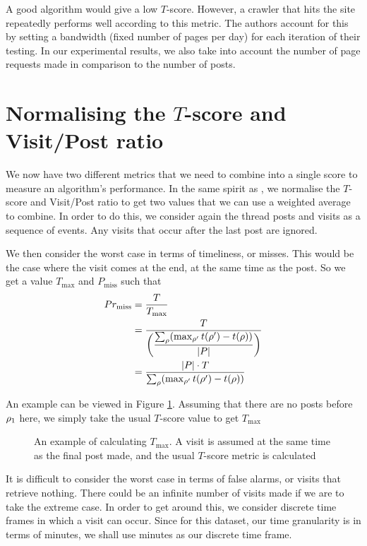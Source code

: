 A good algorithm would give a low $T$-score. However, a crawler that hits the 
site repeatedly performs well according to this metric. The authors account for 
this by setting a bandwidth (fixed number of pages per day) for each iteration 
of their testing. In our experimental results, we also take into account the 
number of page requests made in comparison to the number of posts. %


\section{Normalising the $T$-score and Visit/Post ratio}
We now have two different metrics that we need to combine into a single score to 
measure an algorithm's performance. In the same spirit as 
, we normalise the $T$-score and Visit/Post ratio to get 
two values that we can use a weighted average to combine. In order to do this, 
we consider again the thread posts and visits as a sequence of events. Any 
visits that occur after the last post are ignored.

We then consider the worst case in terms of timeliness, or misses. This would be 
the case where the visit comes at the end, at the same time as the post. So we 
get a value $T_{\max}$ and $P_{\text{miss}}$ such that
\begin{align*}
	\P_{\text{miss}} &= \frac{T}{T_{\max}}\\
							  &= \dfrac{T}{\left(
					\dfrac{%
			\sum_\post (\max_{\post'}t(\post') - t(\post))}{|P|}\right)} \\
					&= \dfrac{|P| \cdot T}{%
		\sum_\post (\max_{\post'}t(\post') - t(\post))}
\end{align*}

\pagebreak
An example can be viewed in Figure \ref{fig:norm_t_score}. Assuming that there 
are no posts before $\rho_1$ here, we simply take the usual $T$-score value to 
get $T_\text{max}$
\begin{figure}
\begin{center}

	\end{center}
\caption{An example of calculating $T_\text{max}$. A visit is assumed at the 
same time as the final post made, and the usual $T$-score metric is 
calculated}\label{fig:norm_t_score}
\end{figure}
It is difficult to consider the worst case in terms of false alarms, or visits 
that retrieve nothing. There could be an infinite number of visits made if we 
are to take the extreme case. In order to get around this, we consider discrete 
time frames in which a visit can occur. Since for this dataset, our time 
granularity is in terms of minutes, we shall use minutes as our discrete time 
frame.

